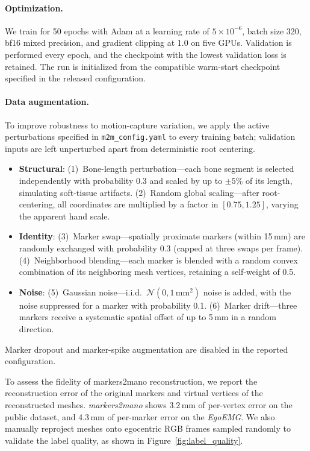 \documentclass[letterpaper]{article} %
\newcommand{\dataset}{\textit{EgoEMG}}
\newcommand{\marker}{\textit{markers2mano}}
\begin{document}
\paragraph{Optimization.}
We train for 50 epochs with Adam at a learning rate of $5\times10^{-6}$,
batch size 320, bf16 mixed precision, and gradient clipping at 1.0 on five
GPUs. Validation is performed every epoch, and the checkpoint with the lowest
validation loss is retained. The run is initialized from the compatible
warm-start checkpoint specified in the released configuration.

\paragraph{Data augmentation.}
To improve robustness to motion-capture variation, we apply the active
perturbations specified in \texttt{m2m\_config.yaml} to every training batch;
validation inputs are left unperturbed apart from deterministic root centering.

\begin{itemize}[leftmargin=1.5em,nosep]
    \item \textbf{Structural}: 
    (1)~Bone-length perturbation---each bone segment is selected independently
    with probability 0.3 and scaled by up to \(\pm 5\%\) of its length,
    simulating soft-tissue artifacts.
    (2)~Random global scaling---after root-centering, all coordinates are multiplied by a factor in \([0.75, 1.25]\), varying the apparent hand scale.
    \item \textbf{Identity}: 
    (3)~Marker swap---spatially proximate markers (within 15\,mm) are randomly exchanged with probability 0.3 (capped at three swaps per frame).
    (4)~Neighborhood blending---each marker is blended with a random convex combination of its neighboring mesh vertices, retaining a self-weight of 0.5.
    \item \textbf{Noise}: 
    (5)~Gaussian noise---i.i.d.\ \(\mathcal{N}(0,1\,\text{mm}^2)\) noise is added, with the noise suppressed for a marker with probability 0.1.
    (6)~Marker drift---three markers receive a systematic spatial offset of up to 5\,mm in a random direction.
\end{itemize}

Marker dropout and marker-spike augmentation are disabled in the reported
configuration.

To assess the fidelity of markers2mano reconstruction, we report the reconstruction error of the original markers and virtual vertices of the reconstructed meshes. \marker{} shows 3.2\,mm of per-vertex error on the public dataset, and 4.3\,mm of per-marker error on the \dataset{}. We also manually reproject meshes onto egocentric RGB frames sampled randomly to validate the label quality, as shown in Figure~\ref{fig:label_quality}.
\end{document}
